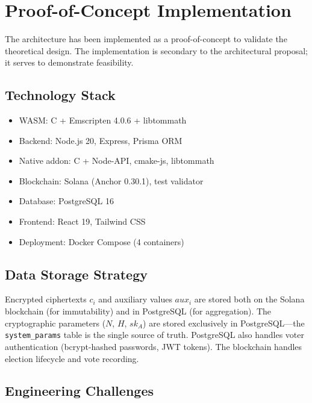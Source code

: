 \documentclass[11pt, a4paper]{article}
\begin{document}
\section{Proof-of-Concept Implementation}\label{sec:implementation}

The architecture has been implemented as a proof-of-concept to validate the theoretical design. The implementation is secondary to the architectural proposal; it serves to demonstrate feasibility.

\subsection{Technology Stack}

\begin{itemize}[leftmargin=*]
    \item WASM: C + Emscripten 4.0.6 + libtommath
    \item Backend: Node.js 20, Express, Prisma ORM
    \item Native addon: C + Node-API, cmake-js, libtommath
    \item Blockchain: Solana (Anchor 0.30.1), test validator
    \item Database: PostgreSQL 16
    \item Frontend: React 19, Tailwind CSS
    \item Deployment: Docker Compose (4 containers)
\end{itemize}

\subsection{Data Storage Strategy}

Encrypted ciphertexts $c_i$ and auxiliary values $aux_i$ are stored both on the Solana blockchain (for immutability) and in PostgreSQL (for aggregation). The cryptographic parameters ($N$, $H$, $sk_A$) are stored exclusively in PostgreSQL---the \texttt{system\_params} table is the single source of truth. PostgreSQL also handles voter authentication (bcrypt-hashed passwords, JWT tokens). The blockchain handles election lifecycle and vote recording.

\subsection{Engineering Challenges}
\end{document}

